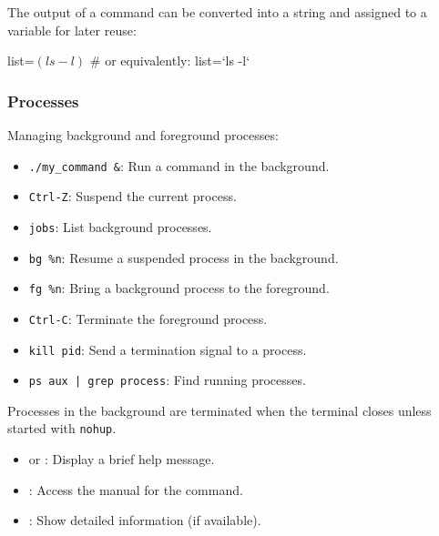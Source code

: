 \begin{exampleblock}[Quoting]
\end{exampleblock}

The output of a command can be converted into a string and assigned to a variable for later reuse: 

\begin{codeblock}[language=bash, numbers=none]
list=$(ls -l)$
# or equivalently:
list=`ls -l`
\end{codeblock}

\subsubsection{Processes}

Managing background and foreground processes:
\begin{itemize}
    \item \texttt{./my\_command \&}: Run a command in the background.
    \item \texttt{Ctrl-Z}: Suspend the current process.
    \item \texttt{jobs}: List background processes.
    \item \texttt{bg \%n}: Resume a suspended process in the background.
    \item \texttt{fg \%n}: Bring a background process to the foreground.
    \item \texttt{Ctrl-C}: Terminate the foreground process.
    \item \texttt{kill pid}: Send a termination signal to a process.
    \item \texttt{ps aux | grep process}: Find running processes.
\end{itemize}

Processes in the background are terminated when the terminal closes unless started with \texttt{nohup}.

\begin{tipsblock}
    \begin{itemize}
        \item {} or : Display a brief help message.
        \item {}: Access the manual for the command.
        \item {}: Show detailed information (if available).
    \end{itemize}
\end{tipsblock}


